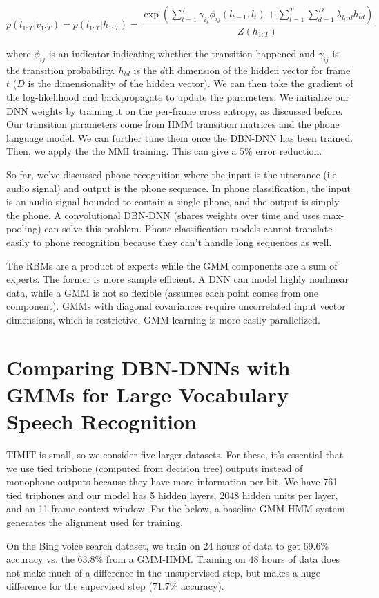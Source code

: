 \documentclass[a4paper]{article}
\begin{document}
$$
p(l_{1:T} | v_{1:T}) = p(l_{1:T} | h_{1:T}) = \frac{
\exp(\sum_{t=1}^{T}{\gamma_{ij} \phi_{ij}(l_{t-1}, l_t) 
+ \sum_{t=1}^{T}{\sum_{d=1}^{D}{\lambda_{l_t, d} h_{td}}} })
}{Z(h_{1:T})}
$$

where $\phi_{ij}$ is an indicator indicating whether the transition happened
and $\gamma_{ij}$ is the transition probability. $h_{td}$ is the $d$th dimension
of the hidden vector for frame $t$ ($D$ is the dimensionality of the hidden
vector). We can then take the gradient of the log-likelihood and backpropagate
to update the parameters. We initialize our DNN weights by training it on
the per-frame cross entropy, as discussed before. Our transition parameters
come from HMM transition matrices and the phone language model. We can
further tune them once the DBN-DNN has been trained. Then, we apply the the
MMI training. This can give a 5\% error reduction.

So far, we've discussed phone recognition where the input is the utterance
(i.e. audio signal) and output is the phone sequence. In phone classification,
the input is an audio signal bounded to contain a single phone, and the output
is simply the phone. A convolutional DBN-DNN (shares weights over time and
uses max-pooling) can solve this problem. Phone classification models cannot
translate easily to phone recognition because they can't handle long sequences 
as well.

The RBMs are a product of experts while the GMM components are a sum of
experts. The former is more sample efficient. A DNN can model highly nonlinear
data, while a GMM is not so flexible (assumes each point comes from one
component). GMMs with diagonal covariances require uncorrelated input vector
dimensions, which is restrictive. GMM learning is more easily parallelized.

\section{Comparing DBN-DNNs with GMMs for Large Vocabulary Speech Recognition}
TIMIT is small, so we consider five larger datasets. For these, it's essential
that we use tied triphone (computed from decision tree) outputs instead of
monophone outputs because they have more information per bit. We have 761
tied triphones and our model has 5 hidden layers, 2048 hidden units per 
layer, and an 11-frame context window. For the below, a baseline GMM-HMM
system generates the alignment used for training.

On the Bing voice search dataset, we train on 24 hours of data to get 69.6\%
accuracy vs. the 63.8\% from a GMM-HMM. Training on 48 hours of data does not
make much of a difference in the unsupervised step, but makes a huge difference
for the supervised step (71.7\% accuracy).
\end{document}
